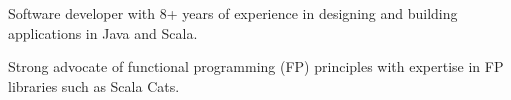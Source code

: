 \begin{cvitems}
\sectionspace
\sectionspace
\vspace{1mm}
	\fontsize{11pt}{1.4em}\bodyfontlight\upshape\color{text}
        \item {Software developer with 8+ years of experience in designing and building applications in Java and Scala.}
        \item {Strong advocate of functional programming (FP) principles with expertise in FP libraries such as Scala Cats.}
        \end{cvitems}
\vspace{1mm}
\sectionspace
